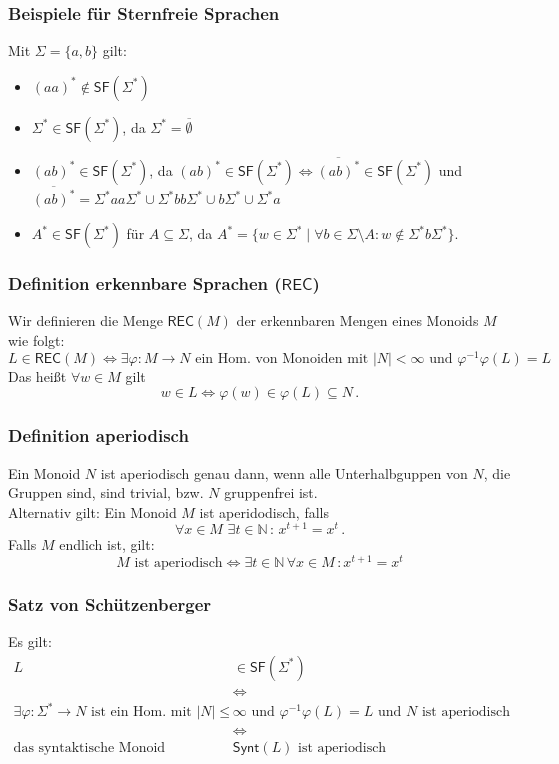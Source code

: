\documentclass[12pt, german]{article}
\newcommand{\N}{\mathbb{N}}
\newcommand{\sigstern}{\Sigma^\ast}
\newcommand{\inv}{^{-1}}
\newcommand{\rec}{\mathsf{REC}}
\newcommand{\starfree}{\mathsf{SF}}
\newcommand{\synt}{\mathsf{Synt}}
\begin{document}
	\subsubsection{Beispiele für Sternfreie Sprachen}
	Mit $\Sigma = \{a,b\}$ gilt:
	\begin{itemize}
		\item $(aa)^\ast \not\in \starfree(\sigstern)$
				\item $\sigstern \in \starfree(\sigstern)$, da $\sigstern = \overline{\emptyset}$
		\item $(ab)^\ast \in \starfree(\sigstern)$, da $(ab)^\ast \in \starfree(\sigstern) \iff \overline{(ab)^\ast}\in \starfree(\sigstern)$ und $\overline{(ab)^\ast} = \sigstern aa \sigstern \cup \sigstern bb \sigstern \cup b\sigstern \cup \sigstern a$
		\item $A^\ast \in \starfree(\sigstern)$ für $A\subseteq \Sigma$, da $A^\ast = \{ w \in \sigstern \mid \forall b \in \Sigma \setminus A : w \notin \sigstern b\sigstern\}$.
	\end{itemize}
	
	
	
	\subsubsection{Definition erkennbare Sprachen ($\rec$)}
	\label{sec:rec}
	Wir definieren die Menge $\rec(M)$ der erkennbaren Mengen eines Monoids $M$ wie folgt:  $$L \in \rec(M) \iff \exists \varphi : M \to N \text{ ein Hom. von Monoiden mit } |N| < \infty \text{ und } \varphi\inv\varphi(L) = L$$
	Das heißt $\forall w \in M$ gilt $$w\in L \iff \varphi(w) \in \varphi(L) \subseteq N\, .$$
	
	\subsubsection{Definition aperiodisch}
	Ein Monoid $N$ ist aperiodisch genau dann, wenn alle Unterhalbguppen von $N$, die Gruppen sind, sind trivial, bzw. $N$ gruppenfrei ist.\\
	Alternativ gilt: Ein Monoid $M$	ist aperidodisch, falls $$\forall x \in M\,\,\exists t \in \N \, : \, x^{t+1} = x^t \, .$$
	Falls $M$ endlich ist, gilt: $$M \text{ ist aperiodisch} \iff \exists t \in \N\, \forall x \in M \, : x^{t+1} = x^t$$
	
	
	\subsubsection{Satz von Schützenberger}
	Es gilt: 
	\begin{align*}
		L &\in \starfree(\sigstern)\\
		&\iff \\
		\exists \varphi: \sigstern \to N \text{ ist ein Hom. mit } |N| \leq &\infty \text{ und } \varphi\inv\varphi(L) = L \text{ und $N$ ist aperiodisch} \\ 
		&\iff \\
		\text{das syntaktische Monoid } &\synt(L) \text{ ist aperiodisch}
	\end{align*}
	
\end{document}
